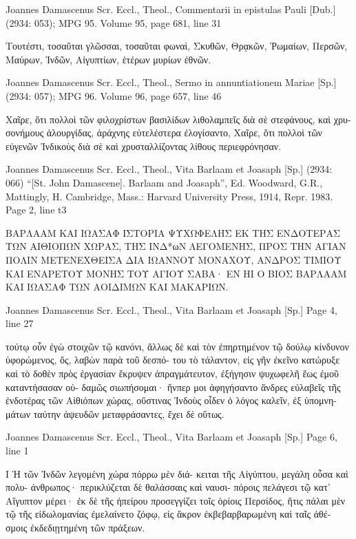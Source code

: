 \documentclass[12pt,letterpaper,twoside,final]{memoir}
\begin{document}
\begin{greek}
Joannes Damascenus Scr. Eccl., Theol., Commentarii in epistulas Pauli [Dub.] (2934: 053); MPG 95.
Volume 95, page 681, line 31

Τουτέστι, τοσαῦται γλῶσσαι, τοσαῦται φωναὶ, 
Σκυθῶν, Θρᾳκῶν, Ῥωμαίων, Περσῶν, Μαύρων, 
Ἰνδῶν, Αἰγυπτίων, ἑτέρων μυρίων ἐθνῶν. 



Joannes Damascenus Scr. Eccl., Theol., Sermo in annuntiationem Mariae [Sp.] (2934: 057); MPG 96.
Volume 96, page 657, line 46

                                                    Χαῖρε, 
ὅτι πολλοὶ τῶν φιλοχρίστων βασιλίδων λιθολαμπεῖς 
διὰ σὲ στεφάνους, καὶ χρυσονήμους ἁλουργίδας, 
ἀράχνης εὐτελέστερα ἐλογίσαντο, Χαῖρε, ὅτι πολλοὶ 
τῶν εὐγενῶν Ἰνδικοὺς διὰ σὲ καὶ χρυσταλλίζοντας 
λίθους περιεφρόνησαν. 



Joannes Damascenus Scr. Eccl., Theol., Vita Barlaam et Joasaph [Sp.] (2934: 066)
“[St. John Damascene]. Barlaam and Joasaph”, Ed. Woodward, G.R., Mattingly, H.
Cambridge, Mass.: Harvard University Press, 1914, Repr. 1983.
Page 2, line t3

ΒΑΡΛΑΑΜ ΚΑΙ ΙΩΑΣΑΦ 
ΙΣΤΟΡΙΑ ΨΥΧΩΦΕΛΗΣ ΕΚ ΤΗΣ ΕΝΔΟΤΕΡΑΣ ΤΩΝ ΑΙΘΙΟΠΩΝ 
ΧΩΡΑΣ, ΤΗΣ ΙΝΔ*ωΝ ΛΕΓΟΜΕΝΗΣ, ΠΡΟΣ ΤΗΝ ΑΓΙΑΝ ΠΟΛΙΝ 
ΜΕΤΕΝΕΧΘΕΙΣΑ ΔΙΑ ΙΩΑΝΝΟΥ ΜΟΝΑΧΟΥ, ΑΝΔΡΟΣ ΤΙΜΙΟΥ 
ΚΑΙ ΕΝΑΡΕΤΟΥ ΜΟΝΗΣ ΤΟΥ ΑΓΙΟΥ ΣΑΒΑ· ΕΝ ΗΙ Ο ΒΙΟΣ 
ΒΑΡΛΑΑΜ ΚΑΙ ΙΩΑΣΑΦ ΤΩΝ ΑΟΙΔΙΜΩΝ ΚΑΙ ΜΑΚΑΡΙΩΝ. 




Joannes Damascenus Scr. Eccl., Theol., Vita Barlaam et Joasaph [Sp.] 
Page 4, line 27

                    τούτῳ οὖν ἐγὼ στοιχῶν τῷ 
κανόνι, ἄλλως δὲ καὶ τὸν ἐπηρτημένον τῷ δούλῳ 
κίνδυνον ὑφορώμενος, ὅς, λαβὼν παρὰ τοῦ δεσπό-
του τὸ τάλαντον, εἰς γῆν ἐκεῖνο κατώρυξε καὶ τὸ 
δοθὲν πρὸς ἐργασίαν ἔκρυψεν ἀπραγμάτευτον, 
ἐξήγησιν ψυχωφελῆ ἕως ἐμοῦ καταντήσασαν οὐ-
δαμῶς σιωπήσομαι· ἥνπερ μοι ἀφηγήσαντο ἄνδρες 
εὐλαβεῖς τῆς ἐνδοτέρας τῶν Αἰθιόπων χώρας, 
οὕστινας Ἰνδοὺς οἶδεν ὁ λόγος καλεῖν, ἐξ ὑπομνη-
μάτων ταύτην ἀψευδῶν μεταφράσαντες, ἔχει δὲ 
οὕτως. 



Joannes Damascenus Scr. Eccl., Theol., Vita Barlaam et Joasaph [Sp.] 
Page 6, line 1

I 
 Ἡ τῶν Ἰνδῶν λεγομένη χώρα πόρρω μὲν διά-
κειται τῆς Αἰγύπτου, μεγάλη οὖσα καὶ πολυ-
άνθρωπος· περικλύζεται δὲ θαλάσσαις καὶ ναυσι-
πόροις πελάγεσι τῷ κατ' Αἴγυπτον μέρει· ἐκ δὲ 
τῆς ἠπείρου προσεγγίζει τοῖς ὁρίοις Περσίδος, 
ἥτις πάλαι μὲν τῷ τῆς εἰδωλομανίας ἐμελαίνετο 
ζόφῳ, εἰς ἄκρον ἐκβεβαρβαρωμένη καὶ ταῖς ἀθέ-
σμοις ἐκδεδιῃτημένη τῶν πράξεων. 




\end{greek}
\end{document}
